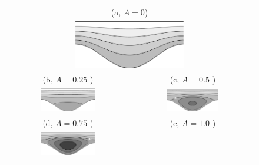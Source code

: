 \documentclass[lineno]{jfm}
\begin{document}
\begin{figure}
\centering
\def\wgh{0.45\textwidth}
\begin{tabular}{cc}
    \multicolumn{2}{c}{(a, $A=0$)} \\
    \multicolumn{2}{c}{\includegraphics[width=\wgh]{figure7a.png}} \\
    (b, $A=0.25$ ) & (c, $A=0.5$ ) \\
    \includegraphics[width=\wgh]{figure7b.png}
    &
    \includegraphics[width=\wgh]{figure7c.png} \\
    (d, $A=0.75$ ) & (e, $A=1.0$ ) \\
    \includegraphics[width=\wgh]{figure7d.png}

\end{tabular}
\end{figure}
\end{document}
